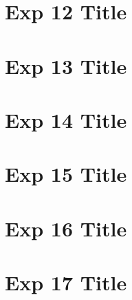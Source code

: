 \documentclass[12pt]{report}
\begin{document}
  \chapter{Exp 12 Title}
  
  
  \chapter{Exp 13 Title}
  
  
  \chapter{Exp 14 Title}
  
  
  \chapter{Exp 15 Title}
  
  
  \chapter{Exp 16 Title}
  
  
  \chapter{Exp 17 Title}
  
 
  
\end{document}
